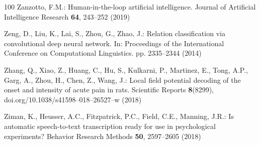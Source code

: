 \documentclass[runningheads]{llncs}
\begin{document}
\begin{thebibliography}{100}
Zanzotto, F.M.: Human-in-the-loop artificial intelligence. Journal of
  Artificial Intelligence Research  \textbf{64},  243--252 (2019)

Zeng, D., Liu, K., Lai, S., Zhou, G., Zhao, J.: Relation classification via
  convolutional deep neural network. In: Proceedings of the International
  Conference on Computational Linguistics. pp. 2335--2344 (2014)

Zhang, Q., Xiao, Z., Huang, C., Hu, S., Kulkarni, P., Martinez, E., Tong, A.P.,
  Garg, A., Zhou, H., Chen, Z., Wang, J.: Local field potential decoding of the
  onset and intensity of acute pain in rats. Scientific Reports
  \textbf{8}(8299),  doi.org/10.1038/s41598--018--26527--w (2018)

Ziman, K., Heusser, A.C., Fitzpatrick, P.C., Field, C.E., Manning, J.R.: Is
  automatic speech-to-text transcription ready for use in psychological
  experiments? Behavior Research Methods  \textbf{50},  2597--2605 (2018)

\end{thebibliography}
\end{document}

